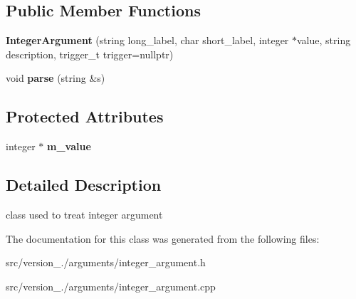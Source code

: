 \subsection*{Public Member Functions}
\begin{DoxyCompactItemize}
\item 
\mbox{\label{classez_1_1arguments_1_1IntegerArgument_a69f681b2f4ac32f560c32c77818c348b}} 
{\bfseries Integer\+Argument} (string long\+\_\+label, char short\+\_\+label, integer $\ast$value, string description, trigger\+\_\+t trigger=nullptr)
\item 
\mbox{\label{classez_1_1arguments_1_1IntegerArgument_a35f36b08ea78d1e8461f442064c8ddb2}} 
void {\bfseries parse} (string \&s)
\end{DoxyCompactItemize}
\subsection*{Protected Attributes}
\begin{DoxyCompactItemize}
\item 
\mbox{\label{classez_1_1arguments_1_1IntegerArgument_ae26dba714e3795690f9bc33fbe0f6b4d}} 
integer $\ast$ {\bfseries m\+\_\+value}
\end{DoxyCompactItemize}


\subsection{Detailed Description}
class used to treat integer argument 

The documentation for this class was generated from the following files\+:\begin{DoxyCompactItemize}
\item 
src/version\+\_./arguments/integer\+\_\+argument.\+h\item 
src/version\+\_./arguments/integer\+\_\+argument.\+cpp\end{DoxyCompactItemize}
